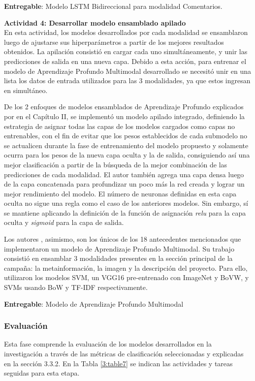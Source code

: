 \textbf{Entregable}: Modelo LSTM Bidireccional para modalidad Comentarios.

\textbf{Actividad 4: Desarrollar modelo ensamblado apilado}
\\
En esta actividad, los modelos desarrollados por cada modalidad se ensamblaron luego de ajustarse sus hiperparámetros a partir de los mejores resultados obtenidos. La apilación consistió en cargar cada uno simultáneamente, y unir las predicciones de salida en una nueva capa. Debido a esta acción, para entrenar el modelo de Aprendizaje Profundo Multimodal desarrollado se necesitó unir en una lista los datos de entrada utilizados para las 3 modalidades, ya que estos ingresan en simultáneo.

De los 2 enfoques de modelos ensamblados de Aprendizaje Profundo explicados por \cite{tec_brownlee2018stacked_models} en el Capítulo II, se implementó un modelo apilado integrado, definiendo la estrategia de asignar todas las capas de los modelos cargados como capas no entrenables, con el fin de evitar que los pesos establecidos de cada submodelo no se actualicen durante la fase de entrenamiento del modelo propuesto y solamente ocurra para los pesos de la nueva capa oculta y la de salida, consiguiendo así una mejor clasificación a partir de la búsqueda de la mejor combinación de las predicciones de cada modalidad. El autor también agrega una capa densa luego de la capa concatenada para profundizar un poco más la red creada y lograr un mejor rendimiento del modelo. El número de neuronas definidas en esta capa oculta no sigue una regla como el caso de los anteriores modelos. Sin embargo, sí se mantiene aplicando la definición de la función de asignación \textit{relu} para la capa oculta y \textit{sigmoid} para la capa de salida.

Los autores \cite{pr_cheng2019deeplearning}, asimismo, son los únicos de los 18 antecedentes mencionados que implementaron un modelo de Aprendizaje Profundo Multimodal. Su trabajo consistió en ensamblar 3 modalidades presentes en la sección principal de la campaña: la metainformación, la imagen y la descripción del proyecto. Para ello, utilizaron los modelos SVM, un VGG16 pre-entrenado con ImageNet y BoVW, y SVMs usando BoW y TF-IDF respectivamente.

\textbf{Entregable}: Modelo de Aprendizaje Profundo Multimodal

\subsubsection{Evaluación}
Esta fase comprende la evaluación de los modelos desarrollados en la investigación a través de las métricas de clasificación seleccionadas y explicadas en la sección 3.3.2. En la Tabla \ref{3:table7} se indican las actividades y tareas seguidas para esta etapa.

